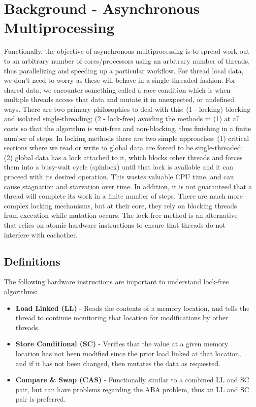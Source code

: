 \documentclass{article}
\begin{document}
\section*{Background - Asynchronous Multiprocessing}
Functionally, the objective of asynchronous multiprocessing is to spread work out to an arbitrary number of cores/processors using an arbitrary number of threads, thus parallelizing and speeding up a particular workflow. For thread local data, we don't need to worry as these will behave in a single-threaded fashion. For shared data, we encounter something called a race condition which is when multiple threads access that data and mutate it in unexpected, or undefined ways.
\newline
\newline
There are two primary philosophies to deal with this: (1 - locking) blocking and isolated single-threading; (2 - lock-free) avoiding the methods in (1) at all costs so that the algorithm is wait-free and non-blocking, thus finishing in a finite number of steps. In locking methods there are two simple approaches: (1) critical sections where we read or write to global data are forced to be single-threaded; (2) global data has a lock attached to it, which blocks other threads and forces them into a busy-wait cycle (spinlock) until that lock is available and it can proceed with its desired operation. This wastes valuable CPU time, and can cause stagnation and starvation over time. In addition, it is not guaranteed that a thread will complete its work in a finite number of steps. There are much more complex locking mechanisms, but at their core, they rely on blocking threads from execution while mutation occurs. The lock-free method is an alternative that relies on atomic hardware instructions to ensure that threads do not interfere with eachother.

\subsection*{Definitions}
The following hardware instructions are important to understand lock-free algorithms:
\begin{itemize}
    \item \textbf{Load Linked (LL)} - Reads the contents of a memory location, and tells the thread to continue monitoring that location for modifications by other threads.
    \item \textbf{Store Conditional (SC)} - Verifies that the value at a given memory location has not been modified since the prior load linked at that location, and if it has not been changed, then mutates the data as requested.
    \item \textbf{Compare \& Swap (CAS)} - Functionally similar to a combined LL and SC pair, but can have problems regarding the ABA problem, thus an LL and SC pair is preferred.
\end{itemize}
\end{document}

